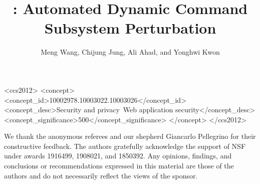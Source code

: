 \documentclass[sigconf]{acmart}
\begin{document}
\fancyhead{}

%
%
\setcounter{figure}{0}
\setcounter{table}{0}
\setcounter{section}{0}
\setcounter{page}{1}
\title{\sysname: Automated Dynamic Command Subsystem Perturbation}%

%

\author{Meng Wang, Chijung Jung, Ali Ahad, and Yonghwi Kwon}





\begin{CCSXML}
<ccs2012>
<concept>
<concept_id>10002978.10003022.10003026</concept_id>
<concept_desc>Security and privacy~Web application security</concept_desc>
<concept_significance>500</concept_significance>
</concept>
</ccs2012>
\end{CCSXML}



\maketitle









\begin{acks}
  We thank the anonymous referees and our shepherd 
Giancarlo Pellegrino for their constructive feedback. The authors gratefully acknowledge the support of NSF under awards 1916499, 1908021, and 1850392. Any opinions, findings, and conclusions or recommendations expressed in this material are those of the authors and do not necessarily reflect the views of the sponsor.
\end{acks}


%






\end{document}

